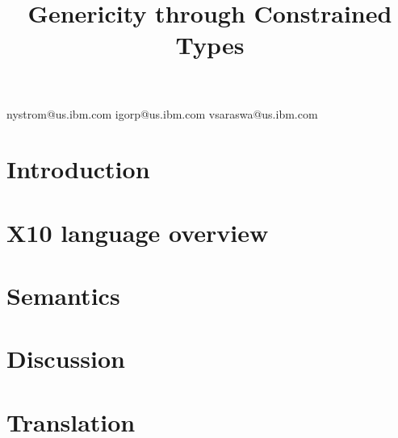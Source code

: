 \documentclass[preprint,nocopyrightspace,9pt]{sigplanconf}
\newif\iflncs
\begin{document}
\title{Genericity through Constrained Types}

\iflncs

\author{
Nathaniel Nystrom\inst{1}
\and
Igor Peshansky\inst{1}
\and
Vijay Saraswat\inst{1}
}

\institute{IBM T.~J. Watson Research~Center,
P.O.~Box~704, Yorktown~Heights NY 10598 USA,
\email{\{nystrom,igorp,vsaraswa\}@us.ibm.com}}

\else

  {nystrom@us.ibm.com}
  {igorp@us.ibm.com}
  {vsaraswa@us.ibm.com}


\fi

\maketitle

\begin{abstract}

\end{abstract}


\section{Introduction}
\label{sec:intro}


\section{X10 language overview}
\label{sec:lang}


\section{Semantics}
\label{sec:semantics}


\eat{}

\section{Discussion}
\label{sec:discussion}


\section{Translation}
\label{sec:translation}
\label{sec:impl}

\end{document}
